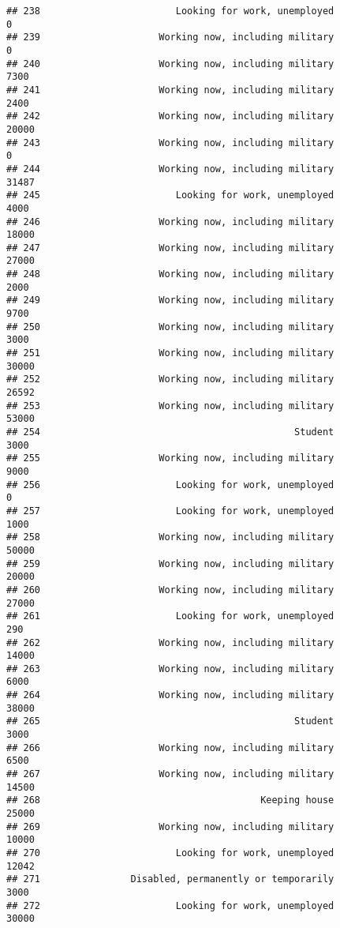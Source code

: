 \documentclass[]{book}
\theoremstyle{definition}
\theoremstyle{definition}
\theoremstyle{remark}
\begin{document}
\begin{verbatim}
## 238                        Looking for work, unemployed               0
## 239                     Working now, including military               0
## 240                     Working now, including military            7300
## 241                     Working now, including military            2400
## 242                     Working now, including military           20000
## 243                     Working now, including military               0
## 244                     Working now, including military           31487
## 245                        Looking for work, unemployed            4000
## 246                     Working now, including military           18000
## 247                     Working now, including military           27000
## 248                     Working now, including military            2000
## 249                     Working now, including military            9700
## 250                     Working now, including military            3000
## 251                     Working now, including military           30000
## 252                     Working now, including military           26592
## 253                     Working now, including military           53000
## 254                                             Student            3000
## 255                     Working now, including military            9000
## 256                        Looking for work, unemployed               0
## 257                        Looking for work, unemployed            1000
## 258                     Working now, including military           50000
## 259                     Working now, including military           20000
## 260                     Working now, including military           27000
## 261                        Looking for work, unemployed             290
## 262                     Working now, including military           14000
## 263                     Working now, including military            6000
## 264                     Working now, including military           38000
## 265                                             Student            3000
## 266                     Working now, including military            6500
## 267                     Working now, including military           14500
## 268                                       Keeping house           25000
## 269                     Working now, including military           10000
## 270                        Looking for work, unemployed           12042
## 271                Disabled, permanently or temporarily            3000
## 272                        Looking for work, unemployed           30000

\end{verbatim}
\end{document}
